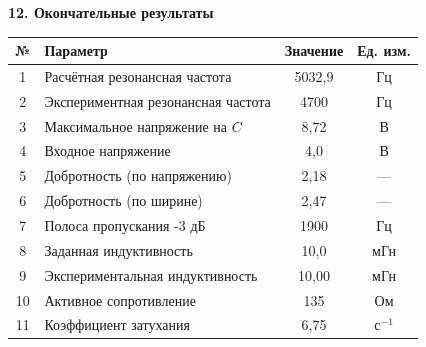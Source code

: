 \documentclass[12pt,fleqn]{article}
\begin{document}
\newpage


\begin{justify}
    \textbf{12. Окончательные результаты} \\
    \begin{table}[h]
    \centering
    \begin{tabular}{|c|l|c|c|}
    \hline
    \textbf{№} & \textbf{Параметр} & \textbf{Значение} & \textbf{Ед. изм.} \\ \hline
    1 & Расчётная резонансная частота & 5032,9 & Гц \\ \hline
    2 & Экспериментная резонансная частота & 4700 & Гц \\ \hline
    3 & Максимальное напряжение на $C$ & 8,72 & В \\ \hline
    4 & Входное напряжение & 4,0 & В \\ \hline
    5 & Добротность (по напряжению) & 2,18 & — \\ \hline
    6 & Добротность (по ширине) & 2,47 & — \\ \hline
    7 & Полоса пропускания -3 дБ & 1900 & Гц \\ \hline
    8 & Заданная индуктивность & 10,0 & мГн \\ \hline
    9 & Экспериментальная индуктивность & 10,00 & мГн \\ \hline
    10 & Активное сопротивление & 135 & Ом \\ \hline
    11 & Коэффициент затухания & 6,75 & с$^{-1}$ \\ \hline
    \end{tabular}
    \end{table}
\end{justify}
\end{document}
